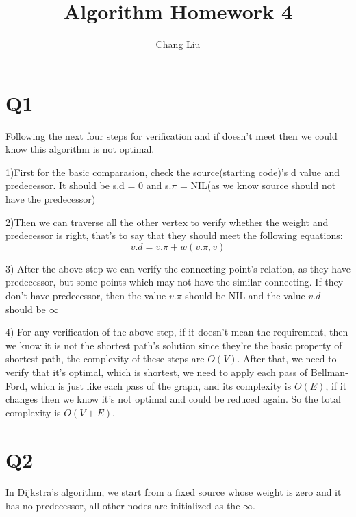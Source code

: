 \documentclass{article}
\title{Algorithm Homework 4}
\author{Chang Liu}
\begin{document}
\pagestyle{main}



\section{Q1}
Following the next four steps for verification and if doesn't meet then we could know this algorithm is not optimal.

1)First for the basic comparasion, check the source(starting code)'s d value and predecessor. It should be
s.d = 0 and s.$\pi$ = NIL(as we know source should not have the predecessor)

2)Then we can traverse all the other vertex to verify whether the weight and predecessor is right, that's to
say that they should meet the following equations:
$$v.d = v.\pi + w(v.\pi, v) $$

3) After the above step we can verify the connecting point's relation, as they have predecessor, but some points
which may not have the similar connecting. If they don't have predecessor, then the value $v.\pi$ should be NIL
and the value $v.d$ should be $\infty$


4) For any verification of the above step, if it doesn't mean the requirement, then we know it is not the shortest
path's solution since they're the basic property of shortest path, the complexity of these steps are $O(V)$. After
that, we need to verify that it's optimal, which is shortest, we need to apply each pass of Bellman-Ford, which is
just like each pass of the graph, and its complexity is $O(E)$, if it changes then we know it's not optimal and could
be reduced again. So the total complexity is $O(V+E)$.

\section{Q2}
In Dijkstra's algorithm, we start from a fixed source whose weight is zero and it has no predecessor, all other nodes
are initialized as the $\infty$.
\end{document}
